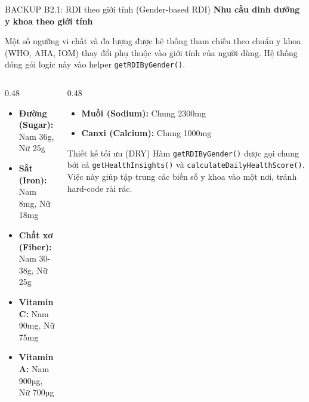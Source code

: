 \documentclass[10pt, aspectratio=169]{beamer}
\begin{document}
\begin{frame}[fragile, label=b2_1]{BACKUP B2.1: RDI theo giới tính (Gender-based RDI)}
\hypertarget{b2_1_target}{}
    \textbf{Nhu cầu dinh dưỡng y khoa theo giới tính}
    \vspace{0.1cm}
    
    Một số ngưỡng vi chất và đa lượng được hệ thống tham chiếu theo chuẩn y khoa (WHO, AHA, IOM) thay đổi phụ thuộc vào giới tính của người dùng. Hệ thống đóng gói logic này vào helper \texttt{getRDIByGender()}.
    
    \vspace{0.2cm}
    \begin{columns}[T]
        \begin{column}{0.48\textwidth}
            \begin{itemize}
                \small
                \item \textbf{Đường (Sugar):} Nam 36g, Nữ 25g
                \item \textbf{Sắt (Iron):} Nam 8mg, Nữ 18mg 
                \item \textbf{Chất xơ (Fiber):} Nam 30-38g, Nữ 25g
                \item \textbf{Vitamin C:} Nam 90mg, Nữ 75mg
                \item \textbf{Vitamin A:} Nam 900µg, Nữ 700µg
            \end{itemize}
        \end{column}
        
        \begin{column}{0.48\textwidth}
            \begin{itemize}
                \small
                \item \textbf{Muối (Sodium):} Chung 2300mg
                \item \textbf{Canxi (Calcium):} Chung 1000mg
            \end{itemize}
            
            \vspace{0.3cm}
            \begin{block}{\small Thiết kế tối ưu (DRY)}
                \footnotesize Hàm \texttt{getRDIByGender()} được gọi chung bởi cả \texttt{getHealthInsights()} và \texttt{calculateDailyHealthScore()}. Việc này giúp tập trung các biến số y khoa vào một nơi, tránh hard-code rải rác.
            \end{block}
        \end{column}
    \end{columns}
\end{frame}
\end{document}

